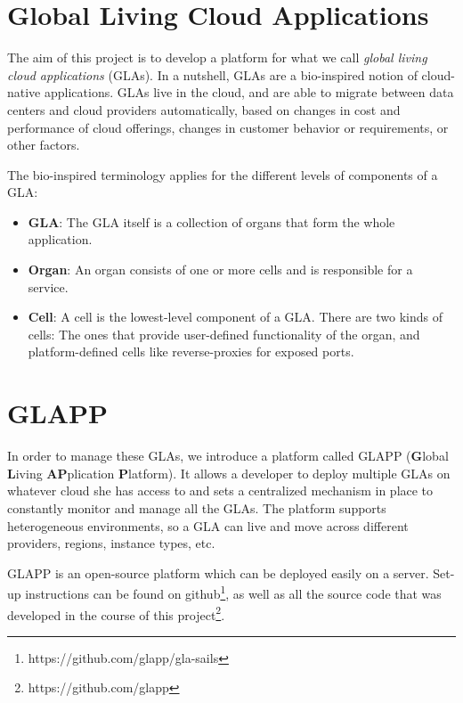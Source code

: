 \documentclass{seal_thesis}
\begin{document}
\section{Global Living Cloud Applications}

The aim of this project is to develop a platform for what we call \textit{global living cloud applications} (GLAs).
In a nutshell, GLAs are a bio-inspired notion of cloud-native applications.
GLAs live in the cloud, and are able to migrate between data centers and cloud providers automatically, based on changes in cost and performance of cloud offerings, changes in customer behavior or requirements, or other factors.

The bio-inspired terminology applies for the different levels of components of a GLA:

\begin{itemize}
	\item \textbf{GLA}: The GLA itself is a collection of organs that form the whole application.
	\item \textbf{Organ}: An organ consists of one or more cells and is responsible for a service.
	\item \textbf{Cell}: A cell is the lowest-level component of a GLA.
	There are two kinds of cells: The ones that provide user-defined functionality of the organ, and platform-defined cells like reverse-proxies for exposed ports.
\end{itemize}


\section{GLAPP}

In order to manage these GLAs, we introduce a platform called GLAPP (\textbf{G}lobal \textbf{L}iving \textbf{AP}plication \textbf{P}latform).
It allows a developer to deploy multiple GLAs on whatever cloud she has access to and sets a centralized mechanism in place to constantly monitor and manage all the GLAs.
The platform supports heterogeneous environments, so a GLA can live and move across different providers, regions, instance types, etc.

GLAPP is an open-source platform which can be deployed easily on a server. Set-up instructions can be found on github\footnote{https://github.com/glapp/gla-sails}, as well as all the source code that was developed in the course of this project\footnote{https://github.com/glapp}.
\end{document}
